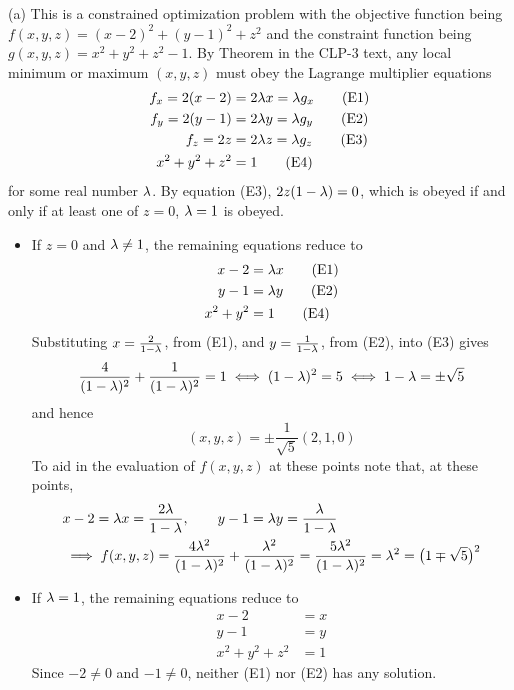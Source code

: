 \begin{solution}
(a)
This is a constrained optimization problem with the objective function being
$f(x,y,z) = (x-2)^2 + (y-1)^2 + z^2$ and the constraint function being
$g(x,y,z) =x^2 + y^2 + z^2 - 1$.
By Theorem  in the CLP-3 text, any local minimum
or maximum $(x,y,z)$ must obey the  Lagrange multiplier equations
\begin{align*}
f_x = 2(x-2) &=2 \lambda x = \lambda g_x \tag{E1} \\ 
f_y = 2(y-1) &=2 \lambda y = \lambda g_y \tag{E2} \\ 
f_z = 2z &=2 \lambda z = \lambda g_z \tag{E3} \\ 
x^2 + y^2 + z^2 &= 1 \tag{E4}
\end{align*}
for some real number $\lambda$. By equation (E3), $2z(1-\lambda)=0$, which is
obeyed if and only if at least one of $z=0$, $\lambda=1$ is obeyed.
\begin{itemize}
\item 
If $z=0$ and $\lambda\ne 1$, the remaining equations reduce to
\begin{align*}
x-2 &= \lambda x  \tag{E1} \\ 
y-1 &= \lambda y \tag{E2} \\ 
x^2  + y^2 &= 1 \tag{E4}
\end{align*}
Substituting $x=\frac{2}{1-\lambda}$, from (E1), and
$y=\frac{1}{1-\lambda}$, from (E2), into (E3) gives
\begin{align*}
\frac{4}{(1-\lambda)^2} + \frac{1}{(1-\lambda)^2} =1
\iff (1-\lambda)^2=5
\iff 1-\lambda =\pm\sqrt{5}
\end{align*}
and hence
\begin{equation*}
(x,y,z) = \pm\frac{1}{\sqrt{5}}(2,1,0)
\end{equation*}
To aid in the evaluation of $f(x,y,z)$ at these points note that,
at these points,
\begin{align*}
&x-2=\lambda x = \frac{2\lambda}{1-\lambda},\qquad
y-1=\lambda y = \frac{\lambda}{1-\lambda} \\
&\implies f(x,y,z) =\frac{4\lambda^2}{(1-\lambda)^2} + \frac{\lambda^2}{(1-\lambda)^2}
                   =\frac{5\lambda^2}{(1-\lambda)^2}
                   =\lambda^2
                   =\big(1\mp\sqrt{5}\big)^2
\end{align*}



\item
If $\lambda=1$, the remaining equations reduce to
\begin{align*}
x-2 &=x  \tag{E1} \\ 
y -1 &=y \tag{E2} \\ 
x^2  +y^2 + z^2 &= 1 \tag{E4}
\end{align*}
Since $-2\ne 0$ and $-1\ne 0$, neither (E1) nor (E2) has any solution.


\end{itemize}
\end{solution}
